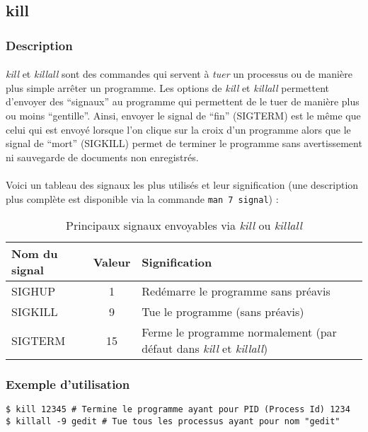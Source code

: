 \subsection*{kill}
\subsubsection*{Description}

\paragraph{}
\emph{kill} et \emph{killall} sont des commandes qui servent à \textit{tuer} un
processus ou de manière plus simple arrêter un programme. Les options de
\emph{kill} et \emph{killall} permettent d'envoyer des ``signaux'' au programme
qui permettent de le tuer de manière plus ou moins ``gentille''. Ainsi, envoyer
le signal de ``fin'' (SIGTERM) est le même que celui qui est envoyé lorsque
l'on clique sur la croix d'un programme alors que le signal de ``mort''
(SIGKILL) permet de terminer le programme sans avertissement ni sauvegarde de
documents non enregistrés.

\paragraph{}
Voici un tableau des signaux les plus utilisés et leur signification
(une description plus complète est disponible via la commande
\lstinline|man 7 signal|) :

\begin{table}[h]
	\centering
	\begin{tabular}{|l|c|l|}
		\hline
		\textbf{Nom du signal} & \textbf{Valeur} & \textbf{Signification} \\
		\hline
		SIGHUP & 1 & Redémarre le programme sans préavis \\
		\hline
		SIGKILL & 9 & Tue le programme (sans préavis) \\
		\hline
		SIGTERM & 15 & Ferme le programme normalement (par défaut dans
		\emph{kill} et \emph{killall}) \\
		\hline
	\end{tabular}
	\caption{Principaux signaux envoyables via \emph{kill} ou \emph{killall}}
	\label{tab:signal}
\end{table}

\subsubsection*{Exemple d'utilisation}

\begin{lstlisting}
$ kill 12345 # Termine le programme ayant pour PID (Process Id) 1234
$ killall -9 gedit # Tue tous les processus ayant pour nom "gedit"
\end{lstlisting}
